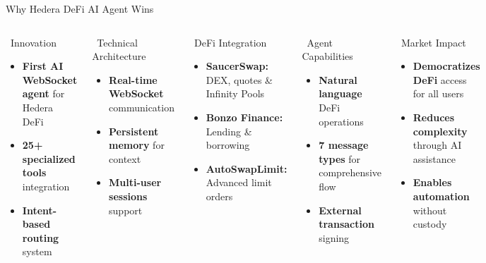 \documentclass[aspectratio=169]{beamer}
\begin{document}
\begin{frame}{Why Hedera DeFi AI Agent Wins}
\begin{columns}
\begin{block}{\faLightbulb\ Innovation}
\begin{itemize}
\item \textbf{First AI WebSocket agent} for Hedera DeFi
\item \textbf{25+ specialized tools} integration
\item \textbf{Intent-based routing} system
\end{itemize}
\end{block}

\begin{block}{\faCogs\ Technical Architecture}
\begin{itemize}
\item \textbf{Real-time WebSocket} communication
\item \textbf{Persistent memory} for context
\item \textbf{Multi-user sessions} support
\end{itemize}
\end{block}

\begin{block}{\faRocket\ DeFi Integration}
\begin{itemize}
\item \textbf{SaucerSwap:} DEX, quotes \& Infinity Pools
\item \textbf{Bonzo Finance:} Lending \& borrowing
\item \textbf{AutoSwapLimit:} Advanced limit orders
\end{itemize}
\end{block}

\begin{block}{\faPlug\ Agent Capabilities}
\begin{itemize}
\item \textbf{Natural language} DeFi operations
\item \textbf{7 message types} for comprehensive flow
\item \textbf{External transaction} signing
\end{itemize}
\end{block}

\begin{block}{\faTrophy\ Market Impact}
\begin{itemize}
\item \textbf{Democratizes DeFi} access for all users
\item \textbf{Reduces complexity} through AI assistance
\item \textbf{Enables automation} without custody
\end{itemize}
\end{block}


\end{columns}
\end{frame}
\end{document}
